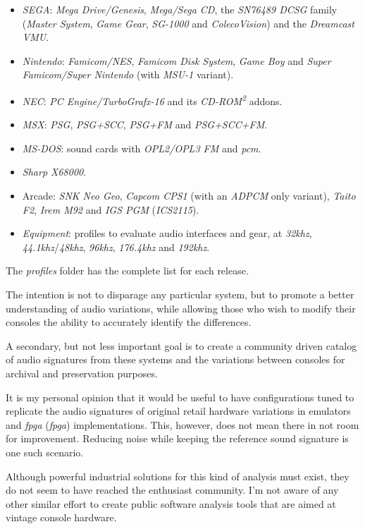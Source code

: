 \documentclass[10pt,a4paper]{report}
\newcommand{\define}[1]{\textit{\acrlong{#1}} (\textit{\acrshort{#1}})}
\newcommand{\ac}[1]{\textit{\mbox{\acrshort{#1}}}}
\newcommand{\khz}[1]{\textit{\mbox{#1\acrshort{khz}}}}
\begin{document}
\begin{itemize}
	\item \textit{SEGA}: \textit{Mega Drive/Genesis}, \textit{Mega/Sega CD}, the \textit{SN76489 DCSG} family (\textit{Master System}, \textit{Game Gear}, \textit{SG-1000} and \textit{ColecoVision}) and the \textit{Dreamcast VMU}.
	\item \textit{Nintendo}: \textit{Famicom/NES}, \textit{Famicom Disk System}, \textit{Game Boy} and \textit{Super Famicom/Super Nintendo} (with \textit{MSU-1} variant).
	\item \textit{NEC}: \textit{PC Engine/TurboGrafx-16} and its \textit{CD-ROM\textsuperscript{2}} addons.
	\item \textit{MSX}: \textit{PSG}, \textit{PSG+SCC}, \textit{PSG+FM} and \textit{PSG+SCC+FM}.
	\item \textit{MS-DOS}: sound cards with \textit{OPL2/OPL3 FM} and \ac{pcm}.
	\item \textit{Sharp X68000}.
	\item Arcade: \textit{SNK Neo Geo}, \textit{Capcom CPS1} (with an \textit{ADPCM} only variant), \textit{Taito F2}, \textit{Irem M92} and \textit{IGS PGM} (\textit{ICS2115}).
	\item \textit{Equipment}: profiles to evaluate audio interfaces and gear, at \khz{32}, \khz{44.1}/\khz{48}, \khz{96}, \khz{176.4} and \khz{192}.
\end{itemize}

The \textit{profiles} folder has the complete list for each release.

The intention is not to disparage any particular system, but to promote a better understanding of audio variations, while allowing those who wish to modify their consoles the ability to accurately identify the differences.

A secondary, but not less important goal is to create a community driven catalog of audio signatures from these systems and the variations between consoles for archival and preservation purposes.

It is my personal opinion that it would be useful to have configurations tuned to replicate the audio signatures of original retail hardware variations in emulators and \define{fpga} implementations. This, however, does not mean there in not room for improvement. Reducing noise while keeping the reference sound signature is one such scenario.

Although powerful industrial solutions for this kind of analysis must exist, they do not seem to have reached the enthusiast community. I'm not aware of any other similar effort to create public software analysis tools that are aimed at vintage console hardware.
\end{document}
